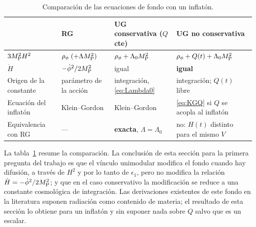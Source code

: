 \begin{table}[t]
\centering\small
\renewcommand{\arraystretch}{1.3}
\begin{tabular}{@{}p{3.1cm}p{3.5cm}p{3.7cm}p{4.2cm}@{}}
\toprule
& \textbf{RG} & \textbf{UG conservativa} ($Q$ cte) & \textbf{UG no conservativa}\\
\midrule
$3M_{\rm P}^2H^2$ & $\rho_\phi\;(+\Lambda M_{\rm P}^2)$ & $\rho_\phi+\Lambda_0M_{\rm P}^2$ & $\rho_\phi+Q(t)+\Lambda_0M_{\rm P}^2$\\
$\dot H$ & $-\dot\phi^2/2M_{\rm P}^2$ & igual & \textbf{igual}\\
Origen de la constante & parámetro de la acción & integración, \eqref{eq:Lambda0} & integración; $Q(t)$ libre\\
Ecuación del inflatón & Klein--Gordon & Klein--Gordon & \eqref{eq:KGQ} si $Q$ se acopla al inflatón\\
Equivalencia con RG & --- & \textbf{exacta}, $\Lambda=\Lambda_0$ & no: $H(t)$ distinto para el mismo $V$\\
\bottomrule
\end{tabular}
\caption{Comparación de las ecuaciones de fondo con un inflatón.}
\label{tab:fondo}
\end{table}

La tabla~\ref{tab:fondo} resume la comparación. La conclusión de esta sección para la primera pregunta del trabajo es que el vínculo unimodular modifica el fondo cuando hay difusión, a través de $H^2$ y por lo tanto de $\epsilon_1$, pero no modifica la relación $\dot H=-\dot\phi^2/2M_{\rm P}^2$; y que en el caso conservativo la modificación se reduce a una constante cosmológica de integración. Las derivaciones existentes de este fondo en la literatura \cite{leon22,piccirilli23} suponen radiación como contenido de materia; el resultado de esta sección lo obtiene para un inflatón y sin suponer nada sobre $Q$ salvo que es un escalar.
